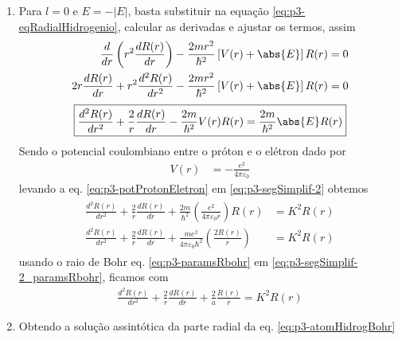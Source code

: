 \begin{prob}
	 \begin{sol}
		 \begin{enumerate}[label=\alph *)]
			 \item Para $l=0$ e $E=-|E|$, basta substituir na equação \eqref{eq:p3-eqRadialHidrogenio}, calcular as derivadas e ajustar os termos, assim
				 \begin{align}
					 \begin{split}
						 \frac{d}{dr}\left(r^{2}\frac{dR(r)}{dr}\right)-\frac{2mr^{2}}{\hbar^{2}}\left[V(r)+\abs{E}\right]R(r) &= 0\\
						 2r \frac{dR(r)}{dr}+r^{2}\frac{d^{2}R(r)}{dr^{2}}-\frac{2mr^{2}}{\hbar^{2}}\left[V(r)+\abs{E}\right]R(r)&=0
					 \end{split}
				 \end{align}
				 \begin{align}
					 \label{eq:p3-segSimplif-2}
					 \boxed{
						 \frac{d^{2}R(r)}{dr^{2}}+\frac{2}{r}\frac{dR(r)}{dr}-\frac{2m}{\hbar^{2}}V(r)R(r) = \frac{2m}{\hbar^{2}}\abs{E}R(r)
					 }
				 \end{align}
				 Sendo o potencial coulombiano entre o próton e o elétron dado por
				 \begin{align}
					 \label{eq:p3-potProtonEletron}
					 V(r) &= -\frac{e^{2}}{4 \pi \varepsilon_{0}}
				 \end{align}
				 levando a eq. \eqref{eq:p3-potProtonEletron} em \eqref{eq:p3-segSimplif-2} obtemos
				 \begin{align}
					 \label{eq:p3-segSimplif-2_paramsRbohr}
					 \begin{split}
						 \frac{d^{2}R(r)}{dr^{2}}+\frac{2}{r}\frac{dR(r)}{dr}+\frac{2m}{\hbar^{2}}\left(\frac{e^{2}}{4 \pi \varepsilon_{0} r}\right)R(r) &= K^{2}R(r)\\
						 \frac{d^{2}R(r)}{dr^{2}}+\frac{2}{r}\frac{dR(r)}{dr}+\frac{me^{2}}{4 \pi \varepsilon_{0}\hbar^{2}}\left(\frac{2R(r)}{ r}\right) &= K^{2}R(r)
					 \end{split}
				 \end{align}
				 usando o raio de Bohr eq. \eqref{eq:p3-paramsRbohr} em \eqref{eq:p3-segSimplif-2_paramsRbohr}, ficamos com
				 \begin{align}
					 \label{eq:p3-atomHidrogBohr}
					 \boxed{
						 \frac{d^{2}R(r)}{dr^{2}}+\frac{2}{r}\frac{dR(r)}{dr}+\frac{2}{a}\frac{R(r)}{r}=K^{2}R(r)
					 }
				 \end{align}
			 \item Obtendo a solução assintótica da parte radial da eq. \eqref{eq:p3-atomHidrogBohr}

\end{enumerate}
\end{sol}
\end{prob}
